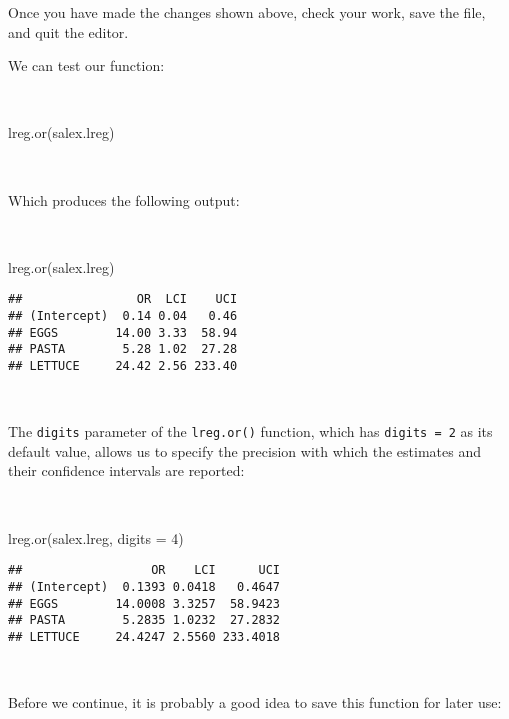 \documentclass[
  12pt,
  a4paper]{book}
\newenvironment{Shaded}{\begin{snugshade}}{\end{snugshade}}
\newcommand{\AttributeTok}[1]{\textcolor[rgb]{0.77,0.63,0.00}{#1}}
\newcommand{\DecValTok}[1]{\textcolor[rgb]{0.00,0.00,0.81}{#1}}
\newcommand{\FunctionTok}[1]{\textcolor[rgb]{0.00,0.00,0.00}{#1}}
\newcommand{\NormalTok}[1]{#1}
\begin{document}
\newpage

Once you have made the changes shown above, check your work, save the file, and quit the editor.

We can test our function:

~

\begin{Shaded}
\begin{Highlighting}[]
\FunctionTok{lreg.or}\NormalTok{(salex.lreg)}
\end{Highlighting}
\end{Shaded}

~

Which produces the following output:

~

\begin{Shaded}
\begin{Highlighting}[]
\FunctionTok{lreg.or}\NormalTok{(salex.lreg)}
\end{Highlighting}
\end{Shaded}

\begin{verbatim}
##                OR  LCI    UCI
## (Intercept)  0.14 0.04   0.46
## EGGS        14.00 3.33  58.94
## PASTA        5.28 1.02  27.28
## LETTUCE     24.42 2.56 233.40
\end{verbatim}

~

The \texttt{digits} parameter of the \texttt{lreg.or()} function, which has \texttt{digits\ =\ 2} as its default value, allows us to specify the precision with which the estimates and their confidence intervals are reported:

~

\begin{Shaded}
\begin{Highlighting}[]
\FunctionTok{lreg.or}\NormalTok{(salex.lreg, }\AttributeTok{digits =} \DecValTok{4}\NormalTok{)}
\end{Highlighting}
\end{Shaded}

\begin{verbatim}
##                  OR    LCI      UCI
## (Intercept)  0.1393 0.0418   0.4647
## EGGS        14.0008 3.3257  58.9423
## PASTA        5.2835 1.0232  27.2832
## LETTUCE     24.4247 2.5560 233.4018
\end{verbatim}

~

Before we continue, it is probably a good idea to save this function for later use:
\end{document}
